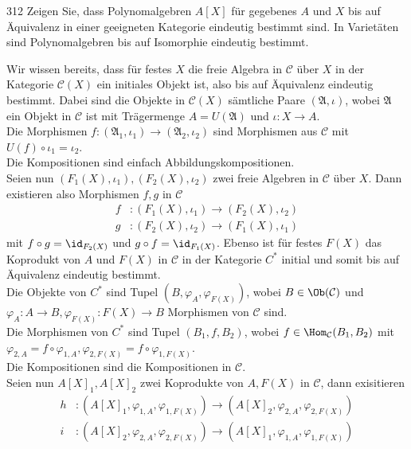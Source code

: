 \begin{algebraUE}{312}
Zeigen Sie, dass Polynomalgebren $A[X]$ für gegebenes $A$ und $X$ bis auf Äquivalenz
in einer geeigneten Kategorie eindeutig bestimmt sind. In Varietäten sind
Polynomalgebren bis auf Isomorphie eindeutig bestimmt.
\end{algebraUE}
\begin{solution}
Wir wissen bereits, dass für festes $X$ die freie Algebra in $\mathcal{C}$
über $X$ in der Kategorie $\mathcal{C}(X)$ ein initiales Objekt ist, also
bis auf Äquivalenz eindeutig bestimmt.
Dabei sind die Objekte in $\mathcal{C}(X)$ sämtliche Paare $(\mathfrak{A},\iota)$,
wobei $\mathfrak{A}$ ein Objekt in $\mathcal{C}$ ist mit Trägermenge $A = U(\mathfrak{A})$
und $\iota: X \to A$. \\
Die Morphismen $f: (\mathfrak{A}_1,\iota_1) \to (\mathfrak{A}_2,\iota_2)$
sind Morphismen aus $\mathcal{C}$ mit $U(f)\circ \iota_1 = \iota_2$. \\
Die Kompositionen sind einfach Abbildungskompositionen. \\
Seien nun $(F_1(X),\iota_1), (F_2(X),\iota_2)$ zwei freie Algebren in $\mathcal{C}$ über $X$.
Dann existieren also Morphismen $f,g$ in $\mathcal{C}$
\begin{align*}
  f&: (F_1(X),\iota_1) \to (F_2(X),\iota_2) \\
  g&: (F_2(X),\iota_2) \to (F_1(X),\iota_1)
\end{align*}
mit $f \circ g = \id_{F_2(X)}$ und $g \circ f = \id_{F_1(X)}$.
Ebenso ist für festes $F(X)$ das
Koprodukt von $A$ und $F(X)$ in $\mathcal{C}$ in der Kategorie $C^*$ initial
und somit bis auf Äquivalenz eindeutig bestimmt. \\
Die Objekte von $C^*$ sind Tupel $(B,\varphi_A,\varphi_{F(X)})$, wobei $B \in \Ob(\mathcal{C})$
und $\varphi_A: A \to B, \varphi_{F(X)}: F(X) \to B$ Morphismen von $\mathcal{C}$ sind. \\
Die Morphismen von $C^*$ sind Tupel $(B_1,f,B_2)$, wobei $f \in \Hom_{\mathcal{C}}(B_1,B_2)$
mit $\varphi_{2,A} = f \circ \varphi_{1,A}, \varphi_{2,F(X)} = f \circ \varphi_{1,F(X)}$. \\
Die Kompositionen sind die Kompositionen in $\mathcal{C}$. \\
Seien nun $A[X]_1,A[X]_2$ zwei Koprodukte von $A,F(X)$ in $\mathcal{C}$, dann exisitieren
\begin{align*}
  h&: (A[X]_1,\varphi_{1,A},\varphi_{1,F(X)}) \to (A[X]_2,\varphi_{2,A},\varphi_{2,F(X)}) \\
  i&: (A[X]_2,\varphi_{2,A},\varphi_{2,F(X)}) \to (A[X]_1,\varphi_{1,A},\varphi_{1,F(X)})

\end{align*}
\end{solution}
